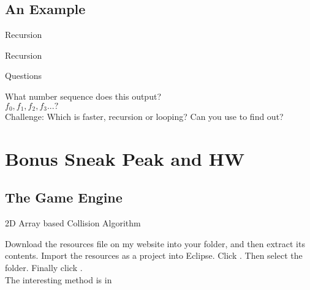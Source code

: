 \subsection{An Example}
\begin{frame}[fragile]{Recursion}
\begin{semiverbatim}\end{semiverbatim}
\end{frame}

\begin{frame}[fragile]{Recursion}
\begin{semiverbatim}\end{semiverbatim}
\end{frame}


\begin{frame}[fragile]{Questions}
\begin{center}
What number sequence does this output?\\
$f_0, f_1, f_2, f_3 ...?$\\ \pause
Challenge: Which is faster, recursion or looping? Can you use \texttt{} to find out?
\end{center}
\end{frame}

\section{Bonus Sneak Peak and HW}
\subsection{The Game Engine}
\begin{frame}{2D Array based Collision Algorithm}
\begin{center}Download the resources file on my website into your  folder, and then extract its contents. Import the resources as a project into Eclipse. Click . Then select the  folder. Finally click .\\

The interesting method is  in \end{center}
\end{frame}

